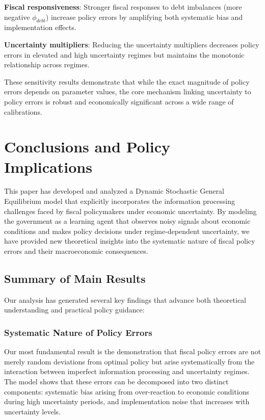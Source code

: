 \documentclass[5p,authoryear]{elsarticle}
\begin{document}
\textbf{Fiscal responsiveness}: Stronger fiscal responses to debt imbalances (more negative $\phi_{debt}$) increase policy errors by amplifying both systematic bias and implementation effects.

\textbf{Uncertainty multipliers}: Reducing the uncertainty multipliers decreases policy errors in elevated and high uncertainty regimes but maintains the monotonic relationship across regimes.

These sensitivity results demonstrate that while the exact magnitude of policy errors depends on parameter values, the core mechanism linking uncertainty to policy errors is robust and economically significant across a wide range of calibrations.

\section{Conclusions and Policy Implications}

This paper has developed and analyzed a Dynamic Stochastic General Equilibrium model that explicitly incorporates the information processing challenges faced by fiscal policymakers under economic uncertainty. By modeling the government as a learning agent that observes noisy signals about economic conditions and makes policy decisions under regime-dependent uncertainty, we have provided new theoretical insights into the systematic nature of fiscal policy errors and their macroeconomic consequences.

\subsection{Summary of Main Results}

Our analysis has generated several key findings that advance both theoretical understanding and practical policy guidance:

\subsubsection{Systematic Nature of Policy Errors}

Our most fundamental result is the demonstration that fiscal policy errors are not merely random deviations from optimal policy but arise systematically from the interaction between imperfect information processing and uncertainty regimes. The model shows that these errors can be decomposed into two distinct components: systematic bias arising from over-reaction to economic conditions during high uncertainty periods, and implementation noise that increases with uncertainty levels.
\end{document}
